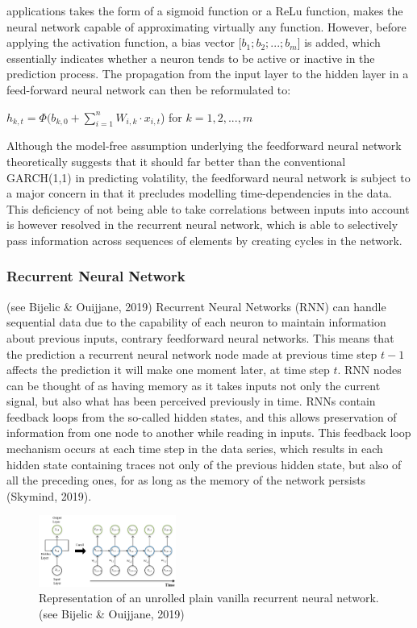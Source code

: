 \documentclass[a4paper,11pt,oneside]{book}
\begin{document}
applications takes the form of a sigmoid function or a ReLu function, makes the neural network capable of approximating virtually any function. However, before applying
the activation function, a bias vector [$b_{1};b_{2};...;b_{m}$] is added, which essentially
indicates whether a neuron tends to be active or inactive in the prediction process. The
propagation from the input layer to the hidden layer in a feed-forward neural
network can then be reformulated to:
 \begin{center}
	$h_{k,t} =\Phi(b_{k,0} +\sum_{i=1}^{n} W_{i,k} \cdot x_{i,t}$) for $k = 1,2,...,m$
\end{center}
Although the model-free assumption underlying the feedforward neural network
theoretically suggests that it should far better than the conventional GARCH(1,1) in
predicting volatility, the feedforward neural network is subject to a
major concern in that it precludes modelling time-dependencies in the data. This
deficiency of not being able to take correlations between inputs into account is
however resolved in the recurrent neural network, which is able to selectively pass
information across sequences of elements by creating cycles in the network.
\subsubsection{Recurrent Neural Network} (see Bijelic \& Ouijjane, 2019)
Recurrent Neural Networks
(RNN) can handle sequential data due to the capability of each neuron to
maintain information about previous inputs, contrary feedforward neural networks. This means that the prediction a recurrent
neural network node made at previous time step $t-1$ affects the prediction it will make one
moment later, at time step $t$. RNN nodes can be thought of as having memory as it takes inputs not only the current signal, but also
what has been perceived previously in time.\newline\newline
RNNs contain feedback loops from the so-called hidden states, and this allows preservation of information from one node to another while reading in inputs. This feedback loop
mechanism occurs at each time step in the data series, which results in each hidden
state containing traces not only of the previous hidden state, but also of all the
preceding ones, for as long as the memory of the network persists (Skymind, 2019).\newline

\begin{figure}
	\centering
	\includegraphics[width=0.4\textwidth]{figures/RNN}
	\caption{Representation of an unrolled plain vanilla recurrent neural network. (see Bijelic \& Ouijjane, 2019)}
	
	\label{seventhfig}
\end{figure}
\end{document}
